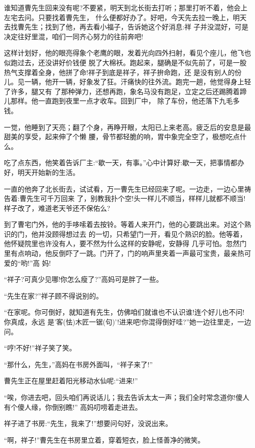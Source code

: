 \documentclass[11pt,a4paper,onecolumn]{article}
\begin{document}
谁知道曹先生回来没有呢?不要紧，明天到北长街去打听；那里打听不着，他会上左宅去问。只要找着曹先生，
什么便都好办了。好吧，今天先去拉一晚上，明天去找曹先生；找到了他，再去看小福子，告诉她这个好消息:祥
子并没混好，可是决定往好里混，咱们一同齐心努力的往前奔吧!

这样计划好，他的眼亮得象个老鹰的眼，发着光向四外扫射，看见个座儿，他飞也似跑过去，还没讲好价钱便
脱了大棉袄。跑起来，腿确是不似先前了，可是一股热气支撑着全身，他拼了命!祥子到底是祥子，祥子拚命跑，还
是没有别人的份儿。见一辆，他开一辆，好象发了狂。汗痛快的往外流。跑完一趟，他觉得身上轻了许多，腿又有
了那种弹力，还想再跑，象名马没有跑足，立定之后还踢腾着蹄儿那样。他一直跑到夜里一点才收车。回到厂中，
除了车份，他还落下九毛多钱。

一觉，他睡到了天亮；翻了个身，再睁开眼，太阳已上来老高。疲乏后的安息是最甜美的享受，起来伸了个懒
腰，骨节都轻脆的响，胃中象完全空了，极想吃点什么。

吃了点东西，他笑着告诉厂主:``歇一天，有事。''心中计算好:歇一天，把事情都办好，明天开始新的生活。

一直的他奔了北长街去，试试看，万一曹先生已经回来了呢。一边走，一边心里祷告着:曹先生可千万回来
了，别教我扑个空!头一样儿不顺当，样样儿就都不顺当!样子改了，难道老天爷还不保佑么?

到了曹宅门外，他的手哆嗦着去按铃。等着人来开门，他的心要跳出来。对这个熟识的门，他并没顾得想过去
的一切，只希望门一开，看见个熟识的脸。他等着，他怀疑院里也许没有人，要不然为什么这样的安静呢，安静得
几乎可怕。忽然门里有点响动，他反倒吓了一跳。门开了，门的响声里夹着一声最可宝贵，最亲热可爱的``哟!''高
妈!

``祥子?可真少见哪!你怎么瘦了?''高妈可是胖了一些。

``先生在家?''祥子顾不得说别的。

``在家呢。你可倒好，就知道有先生，仿佛咱们就谁也不认识谁!连个好儿也不问!你真成，永远
是'客(怯)木匠\myrule 一锯(句)'!进来吧!你混得倒好哇?''她一边往里走，一边问。

``哼!不好!''祥子笑了笑。

``那什么，先生，''高妈在书房外面叫，``祥子来了!''

曹先生正在屋里赶着阳光移动水仙呢:``进来!''

``唉，你进去吧，回头咱们再说话儿；我去告诉太太一声；我们全时常念道你!傻人有个傻人缘，你倒别瞧!''
高妈叨唠着走进去。

祥子进了书房:``先生，我来了!''想要问句好，没说出来。

``啊，祥子!''曹先生在书房里立着，穿着短衣，脸上怪善净的微笑。
\end{document}
